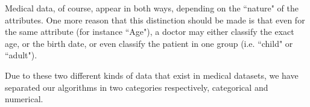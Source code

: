 Medical data, of course, appear in both ways, depending on the ``nature" of the attributes.
One more reason that this distinction should be made is that even for the same attribute (for instance ``Age"), a doctor may either classify the exact age, or the birth date, or even classify the patient in one group (i.e. ``child" or ``adult").

Due to these two different kinds of data that exist in medical datasets, we have separated our algorithms in two categories respectively, categorical and numerical. 





